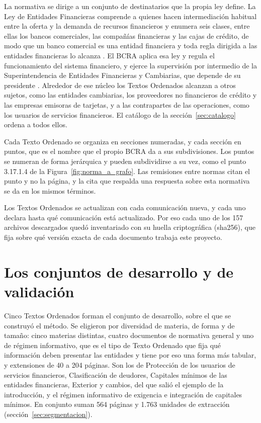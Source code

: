 \documentclass[12pt,a4paper]{report}
\begin{document}
La normativa se dirige a un conjunto de destinatarios que la propia ley define. La Ley de Entidades Financieras comprende a quienes hacen intermediación habitual entre la oferta y la demanda de recursos financieros y enumera seis clases, entre ellas los bancos comerciales, las compañías financieras y las cajas de crédito, de modo que un banco comercial es una entidad financiera y toda regla dirigida a las entidades financieras lo alcanza \cite{ley21526}. El BCRA aplica esa ley y regula el funcionamiento del sistema financiero, y ejerce la supervisión por intermedio de la Superintendencia de Entidades Financieras y Cambiarias, que depende de su presidente \cite{ley24144}. Alrededor de ese núcleo los Textos Ordenados alcanzan a otros sujetos, como las entidades cambiarias, los proveedores no financieros de crédito y las empresas emisoras de tarjetas, y a las contrapartes de las operaciones, como los usuarios de servicios financieros. El catálogo de la sección~\ref{sec:catalogo} ordena a todos ellos.

Cada Texto Ordenado se organiza en secciones numeradas, y cada sección en puntos, que es el nombre que el propio BCRA da a sus subdivisiones. Los puntos se numeran de forma jerárquica y pueden subdividirse a su vez, como el punto 3.17.1.4 de la Figura~\ref{fig:norma_a_grafo}. Las remisiones entre normas citan el punto y no la página, y la cita que respalda una respuesta sobre esta normativa se da en los mismos términos.

Los Textos Ordenados se actualizan con cada comunicación nueva, y cada uno declara hasta qué comunicación está actualizado. Por eso cada uno de los 157 archivos descargados quedó inventariado con su huella criptográfica (sha256), que fija sobre qué versión exacta de cada documento trabaja este proyecto.

\section{Los conjuntos de desarrollo y de validación}


Cinco Textos Ordenados forman el conjunto de desarrollo, sobre el que se construyó el método. Se eligieron por diversidad de materia, de forma y de tamaño: cinco materias distintas, cuatro documentos de normativa general y uno de régimen informativo, que es el tipo de Texto Ordenado que fija qué información deben presentar las entidades y tiene por eso una forma más tabular, y extensiones de 40 a 204 páginas. Son los de Protección de los usuarios de servicios financieros, Clasificación de deudores, Capitales mínimos de las entidades financieras, Exterior y cambios, del que salió el ejemplo de la introducción, y el régimen informativo de exigencia e integración de capitales mínimos. En conjunto suman 564 páginas y 1.763 unidades de extracción (sección~\ref{sec:segmentacion}).
\end{document}
